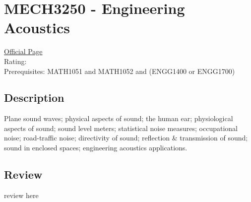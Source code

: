 \hypertarget{MECH3250}{\section{MECH3250 - Engineering Acoustics}}

\large
\textcolor{turbo_purple}{\href{https://my.uq.edu.au/programs-courses/course.html?course_code=MECH3250}{Official Page}} \\
Rating: \cstar\cstar\cstar\cstar\ostar \\
Prerequisites: MATH1051 and MATH1052 and (ENGG1400 or ENGG1700)

\normalsize
\subsection*{Description}
Plane sound waves; physical aspects of sound; the human ear; physiological aspects of sound; sound level meters; statistical noise measures; occupational noise; road-traffic noise; directivity of sound; reflection \& transmission of sound; sound in enclosed spaces; engineering acoustics applications.

\subsection*{Review}
review here
